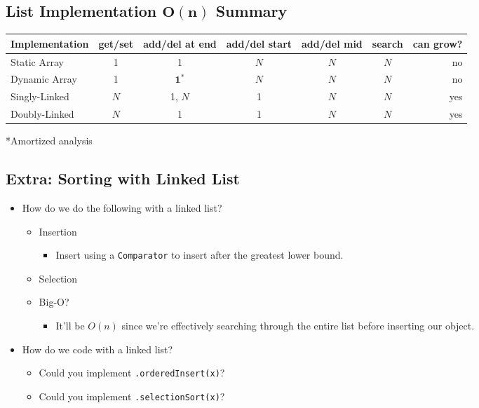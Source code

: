 \documentclass[10pt]{article}
\begin{document}
\subsection*{List Implementation $\mathbf{O(n)}$ Summary}
\begin{center}
    \begin{tabular}{lcccccr} \toprule
        Implementation & get/set & add/del at end & add/del start & add/del mid & search & can grow? \\ \midrule
        Static Array & 1 & 1 & $N$ & $N$ & $N$ & no \\
        Dynamic Array & 1 & $\mathbf{1^*}$ & $N$ & $N$ & $N$ & no \\     Singly-Linked & $N$ & 1, $N$ & 1 & $N$ & $N$ & yes \\
        Doubly-Linked & $N$ & 1 & 1 & $N$ & $N$ & yes \\ \bottomrule
    \end{tabular}
    \begin{center}*Amortized analysis\end{center}
\end{center}

\subsection*{Extra: Sorting with Linked List}
\begin{itemize}
    \item How do we do the following with a linked list?
    \begin{itemize}
        \item Insertion
        \begin{itemize}
            \item Insert using a \texttt{Comparator} to insert after the greatest lower bound.
        \end{itemize}
        \item Selection
        \item Big-O?
        \begin{itemize}
            \item It'll be $O(n)$ since we're effectively searching through the entire list before inserting our object.
        \end{itemize}
    \end{itemize}
    
    \item How do we code with a linked list?
    \begin{itemize}
        \item Could you implement \texttt{.orderedInsert(x)}?
        \item Could you implement \texttt{.selectionSort(x)}?
    \end{itemize}
\end{itemize}
\end{document}
